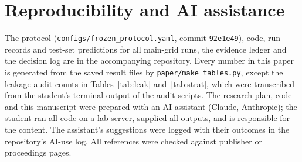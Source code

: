 \documentclass[11pt]{article}
\begin{document}
\section{Reproducibility and AI assistance}
The protocol (\texttt{configs/frozen\_protocol.yaml}, commit \texttt{92e1e49}), code, run records and test-set predictions for all \nRecords{} main-grid runs, the evidence ledger and the decision log are in the accompanying repository. Every number in this paper is generated from the saved result files by \texttt{paper/make\_tables.py}, except the leakage-audit counts in Tables~\ref{tab:leak} and~\ref{tab:strat}, which were transcribed from the student's terminal output of the audit scripts. The research plan, code and this manuscript were prepared with an AI assistant (Claude, Anthropic); the student ran all code on a lab server, supplied all outputs, and is responsible for the content. The assistant's suggestions were logged with their outcomes in the repository's AI-use log. All references were checked against publisher or proceedings pages.



\end{document}
